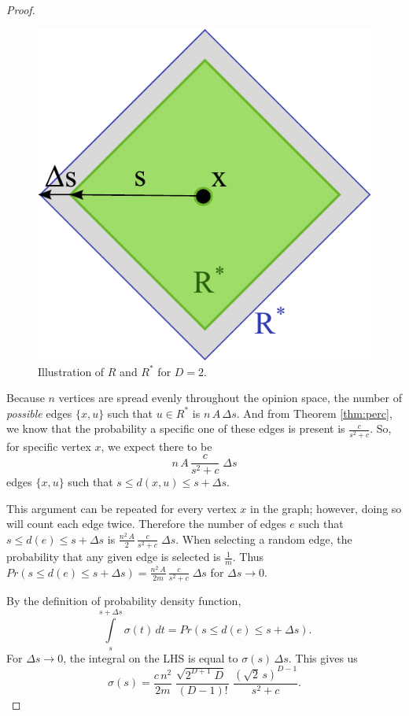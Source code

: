 \documentclass[a4paper,10pt]{article}
\begin{document}
\begin{proof}
\begin{figure}
\centering
\includegraphics[scale=.6]{images/polytope.pdf}
\caption{Illustration of $R$ and $R^*$ for $D = 2$.}
\end{figure}

Because $n$ vertices are spread evenly throughout the opinion space, the number of \emph{possible} edges $\{x, u\}$ such that $u \in R^*$ is 
$n \, A \, \Delta s.$ And from Theorem \ref{thm:perc}, we know that the probability a specific one of these edges is present is $\frac{c}{s^2 + c}$. So, for specific vertex $x$, we expect there to be 
\begin{equation}
n\,A\,\frac{c}{s^2 + c} \; \Delta s 
\end{equation}
 edges $\{x, u\}$ such that $s \leq d(x, u) \leq s + \Delta s.$ 

This argument can be repeated for every vertex $x$ in the graph; however, doing so will count each edge twice. Therefore the number of edges $e$ such that $s \leq d(e) \leq s + \Delta s$ is $\frac{n^2\,A}{2}\,\frac{c}{s^2 + c} \; \Delta s $. When selecting a random edge, the probability that any given edge is selected is $\frac{1}{m}$. Thus $Pr(s \leq d(e) \leq s + \Delta s) = \frac{n^2\,A}{2m}\,\frac{c}{s^2 + c} \; \Delta s $ for $\Delta s \to 0.$

By the definition of probability density function, 
\begin{equation}
 \int\limits_{s}^{s + \Delta s} \sigma(t)\,dt = Pr(s \leq d(e) \leq s + \Delta s).
\end{equation}
For $\Delta s \to 0$, the integral on the LHS is equal to $\sigma(s) \, \Delta s$. This gives us
 \begin{equation}
  \sigma(s) = \frac{c\,n^2}{2m}\;\frac{\sqrt{2^{D+1}\;D} \;}{(D-1)!}\;\frac{(\sqrt{2}\,s)^{D-1}}{s^2 + c}.
 \end{equation}
\end{proof}
\end{document}
